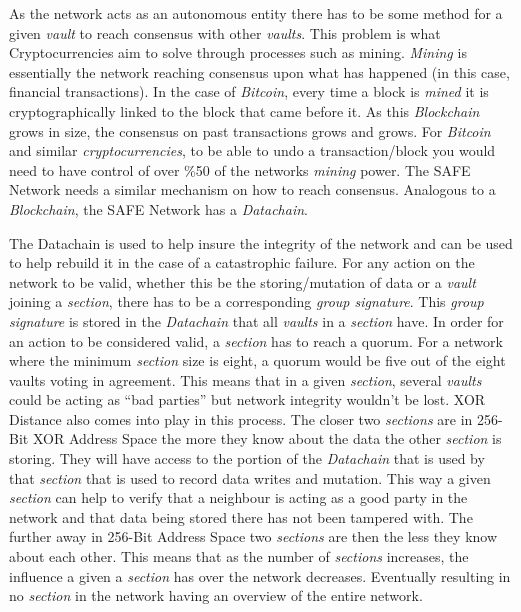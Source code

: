 As the network acts as an autonomous entity there has to be some method for a given \textit{vault} to reach consensus with other \textit{vaults}. This problem is what Cryptocurrencies aim to solve through processes such as mining. \textit{Mining} is essentially the network reaching consensus upon what has happened (in this case, financial transactions). In the case of \textit{Bitcoin}, every time a block is \textit{mined} it is cryptographically linked to the block that came before it. As this \textit{Blockchain} grows in size, the consensus on past transactions grows and grows. For \textit{Bitcoin} and similar \textit{cryptocurrencies}, to be able to undo a transaction/block you would need to have control of over \%50 of the networks \textit{mining} power. The SAFE Network needs a similar mechanism on how to reach consensus. Analogous to a \textit{Blockchain}, the SAFE Network has a \textit{Datachain}. 

The Datachain is used to help insure the integrity of the network and can be used to help rebuild it in the case of a catastrophic failure. For any action on the network to be valid, whether this be the storing/mutation of data or a \textit{vault} joining a \textit{section}, there has to be a corresponding \textit{group signature}. This \textit{group signature} is stored in the \textit{Datachain} that all \textit{vaults} in a \textit{section} have. In order for an action to be considered valid, a \textit{section} has to reach a quorum. For a network where the minimum \textit{section} size is eight, a quorum would be five out of the eight vaults voting in agreement. This means that in a given \textit{section}, several \textit{vaults} could be acting as ``bad parties'' but network integrity wouldn't be lost. XOR Distance also comes into play in this process. The closer two \textit{sections} are in 256-Bit XOR Address Space the more they know about the data the other \textit{section} is storing. They will have access to the portion of the \textit{Datachain} that is used by that \textit{section} that is used to record data writes and mutation. This way a given \textit{section} can help to verify that a neighbour is acting as a good party in the network and that data being stored there has not been tampered with. The further away in 256-Bit Address Space two \textit{sections} are then the less they know about each other. This means that as the number of \textit{sections} increases, the influence a given a \textit{section} has over the network decreases. Eventually resulting in no \textit{section} in the network having an overview of the entire network.

